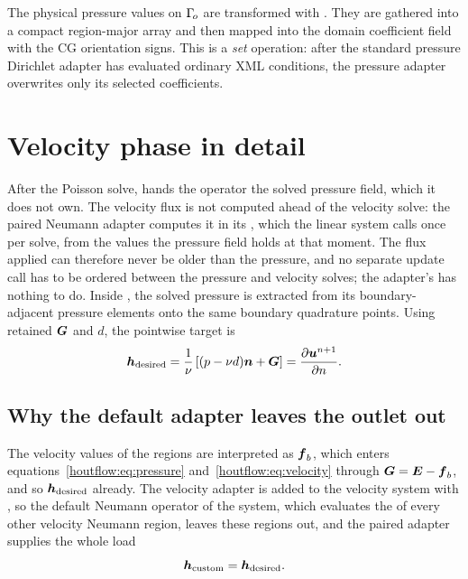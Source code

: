The physical pressure values on $\Gamma_{\!o}$ are transformed with
.  They are gathered into a compact region-major array and
then mapped into the domain coefficient field with the CG orientation signs.
This is a \emph{set} operation: after the standard pressure Dirichlet adapter
has evaluated ordinary XML conditions, the \HOutflow{} pressure adapter
overwrites only its selected coefficients.

\section{Velocity phase in detail}

After the Poisson solve,  hands the operator the solved
pressure field, which it does not own.  The velocity flux is not computed
ahead of the velocity solve: the paired Neumann adapter computes it in its
, which the linear system calls once per solve, from the values
the pressure field holds at that moment.  The flux applied can therefore
never be older than the pressure, and no separate update call has to be
ordered between the pressure and velocity solves; the adapter's
 has nothing to do.  Inside , the solved
pressure is extracted from its boundary-adjacent pressure elements onto the
same boundary quadrature points.
Using retained $\boldsymbol{G}$ and $d$, the pointwise target is
\begin{equation}
  \boldsymbol{h}_{\mathrm{desired}}
  =\frac{1}{\nu}\left[(p-\nu d)\boldsymbol{n}+\boldsymbol{G}\right]
  =\frac{\partial\boldsymbol{u}^{n+1}}{\partial n}.
  \label{houtflow:eq:desired}
\end{equation}

\subsection{Why the default adapter leaves the outlet out}

The velocity values of the \HOutflow{} regions are interpreted as
$\boldsymbol{f}_b$, which enters equations~\eqref{houtflow:eq:pressure}
and~\eqref{houtflow:eq:velocity} through $\boldsymbol{G}=\boldsymbol{E}-\boldsymbol{f}_b$, and
so $\boldsymbol{h}_{\mathrm{desired}}$ already.
The velocity adapter is added to the velocity system with
, so the default Neumann operator of
the system, which evaluates the  of every other velocity
Neumann region, leaves these regions out, and the paired adapter supplies
the whole load
\begin{equation}
  \boldsymbol{h}_{\mathrm{custom}}=\boldsymbol{h}_{\mathrm{desired}}.
  \label{houtflow:eq:velocity-load}
\end{equation}

